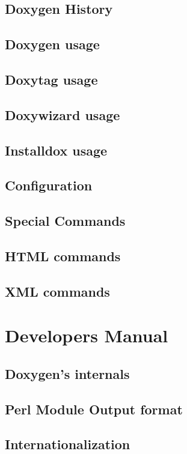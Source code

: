 \documentclass[a4paper]{report}
\begin{document}
\chapter{Doxygen History}\label{history}\hypertarget{history}{}
\chapter{Doxygen usage}\label{doxygen__usage}\hypertarget{doxygen__usage}{}
\chapter{Doxytag usage}\label{doxytag__usage}\hypertarget{doxytag__usage}{}
\chapter{Doxywizard usage}\label{doxywizard__usage}\hypertarget{doxywizard__usage}{}
\chapter{Installdox usage}\label{installdox__usage}\hypertarget{installdox__usage}{}
\chapter{Configuration}\label{config}\hypertarget{config}{}
\chapter{Special Commands}\label{commands}\hypertarget{commands}{}
\chapter{HTML commands}\label{htmlcmds}\hypertarget{htmlcmds}{}
\chapter{XML commands}\label{xmlcmds}\hypertarget{xmlcmds}{}
\part{Developers Manual}
\chapter{Doxygen's internals}\label{arch}\hypertarget{arch}{}
\chapter{Perl Module Output format}\label{perlmod}\hypertarget{perlmod}{}
\chapter{Internationalization}\label{langhowto}\hypertarget{langhowto}{}
\printindex
\end{document}
